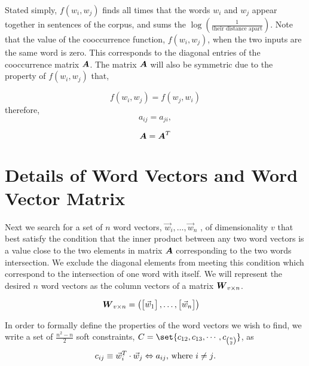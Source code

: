 \documentclass{article}
\begin{document}
Stated simply, $f(w_i, w_j)$ finds all times that the words $w_i$ and $w_j$ appear together in sentences of the corpus, and sums the $\log \left( \frac{1}{\text{their distance apart}} \right)$. Note that the value of the cooccurrence function, $f(w_i, w_j)$, when the two inputs are the same word is zero. This corresponds to the diagonal entries of the cooccurrence matrix $\boldsymbol{A}$. The matrix $\boldsymbol{A}$ will also be symmetric due to the property of $f(w_i, w_j)$ that,

\begin{equation*}
f(w_i,w_j) = f(w_j,w_i)
\end{equation*}
therefore,
\begin{equation*}
a_{ij} = a_{ji},
\end{equation*}

\begin{equation*}
\boldsymbol{A} = \boldsymbol{A}^T
\end{equation*}


%
%

\section{Details of Word Vectors and Word Vector Matrix}
Next we search for a set of $n$ word vectors, $\vec{w}_{i},\ldots ,\vec{w}_{n}$ , of dimensionality $v$ that best satisfy the condition that the inner product between any two word vectors is a value close to the two elements in matrix $\boldsymbol{A}$ corresponding to the two words intersection. We exclude the diagonal elements from meeting this condition which correspond to the intersection of one word with itself. We will represent the desired $n$ word vectors as the column vectors of a matrix $\boldsymbol{{W}}_{{v} \times {n}}$.

  \begin{align*}
    \boldsymbol{{W}}_{{v} \times {n}} &= \begin{pmatrix}
    	\begin{bmatrix} \vec{w}_{1} \end{bmatrix} , \ldots , \begin{bmatrix} \vec{w}_{n}\end{bmatrix}
	 \end{pmatrix}
  \end{align*}

In order to formally define the properties of the word vectors we wish to find, we write a set of $\frac{n^2 - n}{2}$ soft constraints, $C = \set{c_{12},c_{13},\cdots ,c_{n \choose 2}}$, as
\begin{equation*}
c_{ij} \equiv \vec{w}_{i}^T \cdot \vec{w}_{j} \logeq a_{ij} \text{, where $i \neq j$.}
\end{equation*}
\end{document}
